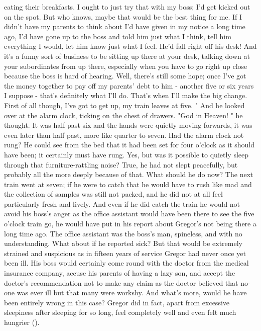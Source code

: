 \documentclass[listoffigures, listoftables]{ifathesis}
\begin{document}
eating their breakfasts. I ought to just try that with my boss; I'd get kicked out on the spot. But who knows, maybe that would be the best thing for me. If I didn't have my parents to think about I'd have given in my notice a long time ago, I'd have gone up to the boss and told him just what I think, tell him everything I would, let him know just what I feel. He'd fall right off his desk! And it's a funny sort of business to be sitting up there at your desk, talking down at your subordinates from up there, especially when you have to go right up close because the boss is hard of hearing. Well, there's still some hope; once I've got the money together to pay off my parents' debt to him - another five or six years I suppose - that's definitely what I'll do. That's when I'll make the big change. First of all though, I've got to get up, my train leaves at five. " And he looked over at the alarm clock, ticking on the chest of drawers. "God in Heaven! " he thought. It was half past six and the hands were quietly moving forwards, it was even later than half past, more like quarter to seven. Had the alarm clock not rung? He could see from the bed that it had been set for four o'clock as it should have been; it certainly must have rung. Yes, but was it possible to quietly sleep through that furniture-rattling noise? True, he had not slept peacefully, but probably all the more deeply because of that. What should he do now? The next train went at seven; if he were to catch that he would have to rush like mad and the collection of samples was still not packed, and he did not at all feel particularly fresh and lively. And even if he did catch the train he would not avoid his boss's anger as the office assistant would have been there to see the five o'clock train go, he would have put in his report about Gregor's not being there a long time ago. The office assistant was the boss's man, spineless, and with no understanding. What about if he reported sick? But that would be extremely strained and suspicious as in fifteen years of service Gregor had never once yet been ill. His boss would certainly come round with the doctor from the medical insurance company, accuse his parents of having a lazy son, and accept the doctor's recommendation not to make any claim as the doctor believed that no-one was ever ill but that many were workshy. And what's more, would he have been entirely wrong in this case? Gregor did in fact, apart from excessive sleepiness after sleeping for so long, feel completely well and even felt much hungrier (\cite{frankel}).
\end{document}
